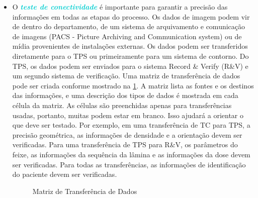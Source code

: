 \documentclass[11pt,a4paper]{article}
\newcounter{exemplo}
\begin{document}
\begin{itemize}[label=\textcolor{CarnationPink}{$\star$}]
		\item O \textcolor{DarkTurquoise}{\textbf{\textit{teste de conectividade}}} é importante para garantir a precisão das informações em todas as etapas do processo. Os dados de imagem podem vir de dentro do departamento, de um sistema de arquivamento e comunicação de imagens (PACS - Picture Archiving and Communication system) ou de mídia provenientes de instalações externas. Os dados podem ser transferidos diretamente para o TPS ou primeiramente para um sistema de contorno. Do TPS, os dados podem ser enviados para o sistema Record \& Verify (R\&V) e um segundo sistema de verificação. Uma matriz de transferência de dados pode ser criada conforme mostrado na \ref{fig:matrixTransferenciaDados}. A matriz lista as fontes e os destinos das informações, e uma descrição dos tipos de dados é mostrada em cada célula da matriz. As células são preenchidas apenas para transferências usadas, portanto, muitas podem estar em branco. Isso ajudará a orientar o que deve ser testado. Por exemplo, em uma transferência de TC para TPS, a precisão geométrica, as informações de densidade e a orientação devem ser verificadas. Para uma transferência de TPS para R\&V, os parâmetros do feixe, as informações da sequência da lâmina e as informações da dose devem ser verificadas. Para todas as transferências, as informações de identificação do paciente devem ser verificadas.
		
		\begin{figure}[!h]
			\centering
			\caption{Matriz de Transferência de Dados}
			\label{fig:matrixTransferenciaDados}
		\end{figure}
	

\end{itemize}
\end{document}
